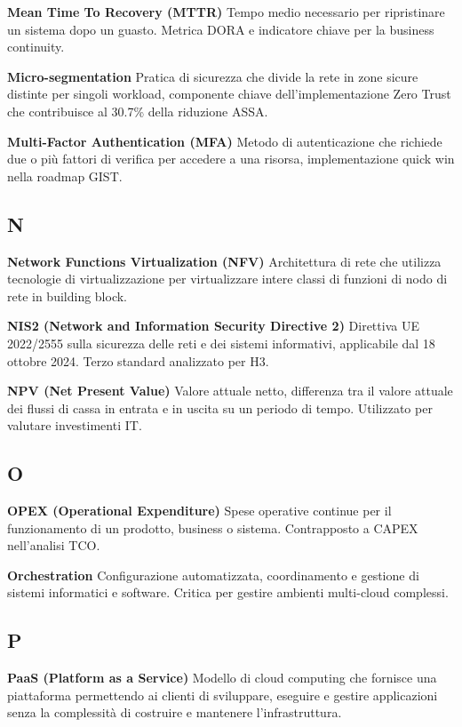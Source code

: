 \documentclass{report}
\begin{document}
\textbf{Mean Time To Recovery (MTTR)} Tempo medio necessario per
ripristinare un sistema dopo un guasto. Metrica DORA e indicatore chiave
per la business continuity.

\textbf{Micro-segmentation} Pratica di sicurezza che divide la rete in
zone sicure distinte per singoli workload, componente chiave
dell'implementazione Zero Trust che contribuisce al 30.7\% della
riduzione ASSA.

\textbf{Multi-Factor Authentication (MFA)} Metodo di autenticazione che
richiede due o più fattori di verifica per accedere a una risorsa,
implementazione quick win nella roadmap GIST.

\subsection{N}\label{n}

\textbf{Network Functions Virtualization (NFV)} Architettura di rete che
utilizza tecnologie di virtualizzazione per virtualizzare intere classi
di funzioni di nodo di rete in building block.

\textbf{NIS2 (Network and Information Security Directive 2)} Direttiva
UE 2022/2555 sulla sicurezza delle reti e dei sistemi informativi,
applicabile dal 18 ottobre 2024. Terzo standard analizzato per H3.

\textbf{NPV (Net Present Value)} Valore attuale netto, differenza tra il
valore attuale dei flussi di cassa in entrata e in uscita su un periodo
di tempo. Utilizzato per valutare investimenti IT.

\subsection{O}\label{o}

\textbf{OPEX (Operational Expenditure)} Spese operative continue per il
funzionamento di un prodotto, business o sistema. Contrapposto a CAPEX
nell'analisi TCO.

\textbf{Orchestration} Configurazione automatizzata, coordinamento e
gestione di sistemi informatici e software. Critica per gestire ambienti
multi-cloud complessi.

\subsection{P}\label{p}

\textbf{PaaS (Platform as a Service)} Modello di cloud computing che
fornisce una piattaforma permettendo ai clienti di sviluppare, eseguire
e gestire applicazioni senza la complessità di costruire e mantenere
l'infrastruttura.
\end{document}
